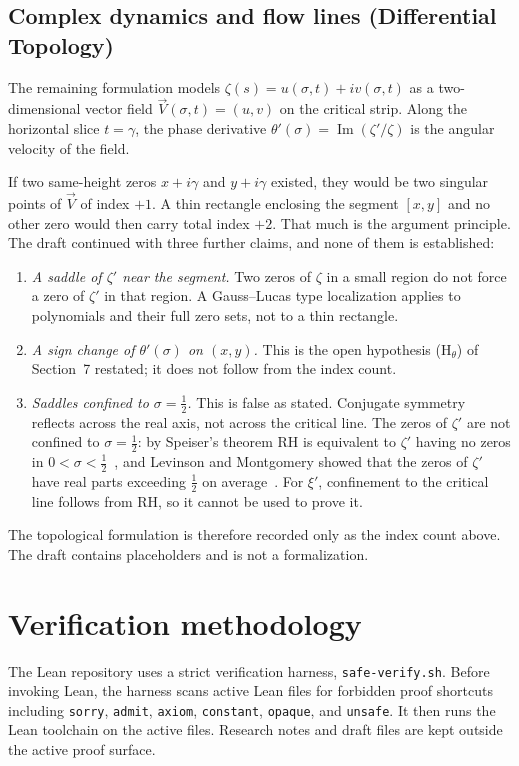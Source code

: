 \documentclass[11pt]{amsart}
\newcommand{\zetaR}{\zeta}
\newcommand{\im}{\operatorname{Im}}
\newcommand{\lean}[1]{\texttt{#1}}
\newcommand{\leanpath}[1]{\path{#1}}
\begin{document}
\subsection{Complex dynamics and flow lines (Differential Topology)}
The remaining formulation models $\zetaR(s) = u(\sigma, t) + i v(\sigma, t)$ as a two-dimensional vector field $\vec{V}(\sigma, t) = (u, v)$ on the critical strip. Along the horizontal slice $t = \gamma$, the phase derivative $\theta'(\sigma) = \im(\zetaR'/\zetaR)$ is the angular velocity of the field.

If two same-height zeros $x + i\gamma$ and $y + i\gamma$ existed, they would be two singular points of $\vec{V}$ of index $+1$. A thin rectangle enclosing the segment $[x,y]$ and no other zero would then carry total index $+2$. That much is the argument principle. The draft continued with three further claims, and none of them is established:
\begin{enumerate}
\item \emph{A saddle of $\zetaR'$ near the segment.} Two zeros of $\zetaR$ in a small region do not force a zero of $\zetaR'$ in that region. A Gauss--Lucas type localization applies to polynomials and their full zero sets, not to a thin rectangle.
\item \emph{A sign change of $\theta'(\sigma)$ on $(x,y)$.} This is the open hypothesis (H$_\theta$) of Section~7 restated; it does not follow from the index count.
\item \emph{Saddles confined to $\sigma=\tfrac12$.} This is false as stated. Conjugate symmetry reflects across the real axis, not across the critical line. The zeros of $\zetaR'$ are not confined to $\sigma=\tfrac12$: by Speiser's theorem RH is equivalent to $\zetaR'$ having no zeros in $0<\sigma<\tfrac12$~\cite{Speiser1935}, and Levinson and Montgomery showed that the zeros of $\zetaR'$ have real parts exceeding $\tfrac12$ on average~\cite{LevinsonMontgomery1974}. For $\xi'$, confinement to the critical line follows from RH, so it cannot be used to prove it.
\end{enumerate}
The topological formulation is therefore recorded only as the index count above. The draft \leanpath{TopologicalFlow.lean.draft} contains placeholders and is not a formalization.

\section{Verification methodology}

The Lean repository uses a strict verification harness, \lean{safe-verify.sh}.
Before invoking Lean, the harness scans active Lean files for forbidden proof
shortcuts including \lean{sorry}, \lean{admit}, \lean{axiom}, \lean{constant},
\lean{opaque}, and \lean{unsafe}.  It then runs the Lean toolchain on the active
files.  Research notes and draft files are kept outside the active proof
surface.
\end{document}

